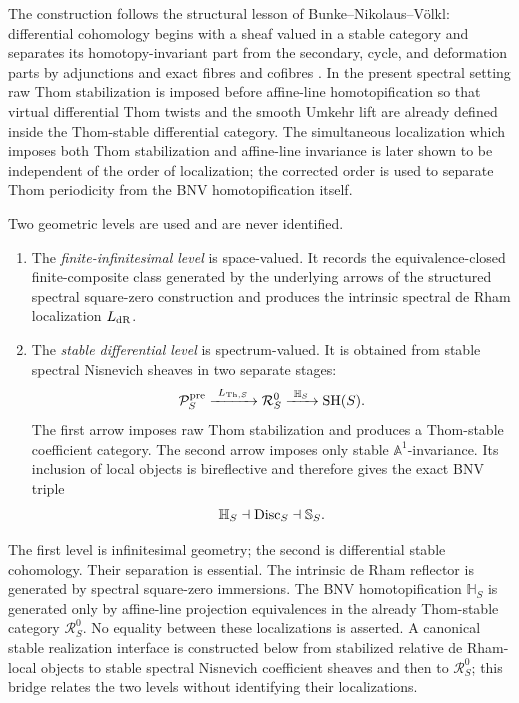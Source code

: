 The construction follows the structural lesson of
Bunke--Nikolaus--V\"olkl: differential cohomology begins with a sheaf valued in
a stable category and separates its homotopy-invariant part from the secondary,
cycle, and deformation parts by adjunctions and exact fibres and cofibres
\cite[Sections~2--3]{BunkeNikolausVoelkl}.  In the present spectral setting raw
Thom stabilization is imposed before affine-line homotopification so that
virtual differential Thom twists and the smooth Umkehr lift are already defined
inside the Thom-stable differential category.  The simultaneous localization
which imposes both Thom stabilization and affine-line invariance is later shown
to be independent of the order of localization; the corrected order is used to
separate Thom periodicity from the BNV homotopification itself.

Two geometric levels are used and are never identified.

\begin{enumerate}
\item The \emph{finite-infinitesimal level} is space-valued.  It records
the equivalence-closed finite-composite class generated by the underlying
arrows of the structured spectral square-zero construction and produces the
intrinsic spectral de Rham localization \(L_{\mathrm{dR}}\).
\item The \emph{stable differential level} is spectrum-valued.  It is obtained
from stable spectral Nisnevich sheaves in two separate stages:
\[
  \mathcal P_S^{\mathrm{pre}}
  \xrightarrow{\ L_{\mathrm{Th},S}\ }
  \mathcal R_S^0
  \xrightarrow{\ \mathbb H_S\ }
  \mathrm{SH}(S).
\]
The first arrow imposes raw Thom stabilization and produces a Thom-stable
coefficient category.  The second arrow imposes only stable
\(\mathbb A^1\)-invariance.  Its inclusion of local objects is bireflective and
therefore gives the exact BNV triple
\[
  \mathbb H_S\dashv\operatorname{Disc}_S\dashv\mathbb S_S.
\]
\end{enumerate}

The first level is infinitesimal geometry; the second is differential stable
cohomology.  Their separation is essential.  The intrinsic de Rham reflector
is generated by spectral square-zero immersions.  The BNV homotopification
\(\mathbb H_S\) is generated only by affine-line projection equivalences in the
already Thom-stable category \(\mathcal R_S^0\).  No equality between these
localizations is asserted.  A canonical stable realization interface is
constructed below from stabilized relative de Rham-local objects to stable
spectral Nisnevich coefficient sheaves and then to \(\mathcal R_S^0\); this
bridge relates the two levels without identifying their localizations.

